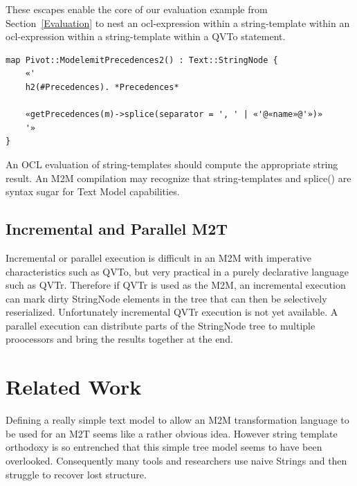 \documentclass{llncs}
\begin{document}
These escapes enable the core of our evaluation example from Section~\ref{Evaluation} to nest an ocl-expression within a string-template within an ocl-expression within a string-template within a QVTo statement.

\begin{verbatim}
map Pivot::ModelemitPrecedences2() : Text::StringNode {
    «'
    h2(#Precedences). *Precedences*
	
    «getPrecedences(m)->splice(separator = ', ' | «'@«name»@'»)»
    '»
}
\end{verbatim}

An OCL evaluation of string-templates should compute the appropriate string result. An M2M compilation may recognize that string-templates and splice() are syntax sugar for Text Model capabilities.



\subsection{Incremental and Parallel M2T}\label{Incremental M2T}

Incremental or parallel execution is difficult in an M2M with imperative characteristics such as QVTo, but very practical in a purely declarative language such as QVTr. Therefore if QVTr is used as the M2M, an incremental execution can mark dirty StringNode elements in the tree that can then be selectively reserialized. Unfortunately incremental QVTr execution is not yet available. A parallel execution can distribute parts of the StringNode tree to multiple proocessors and bring the results together at the end.

\section{Related Work}\label{Related Work}

Defining a really simple text model to allow an M2M transformation language to be used for an M2T seems like a rather obvious idea. However string template orthodoxy is so entrenched that this simple tree model seems to have been overlooked. Consequently many tools and researchers use naive Strings and then struggle to recover lost structure.
\end{document}
